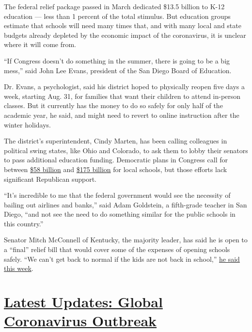 The federal relief package passed in March dedicated \$13.5 billion to
K-12 education --- less than 1 percent of the total stimulus. But
education groups estimate that schools will need many times that, and
with many local and state budgets already depleted by the economic
impact of the coronavirus, it is unclear where it will come from.

``If Congress doesn't do something in the summer, there is going to be a
big mess,'' said John Lee Evans, president of the San Diego Board of
Education.

Dr. Evans, a psychologist, said his district hoped to physically reopen
five days a week, starting Aug. 31, for families that want their
children to attend in-person classes. But it currently has the money to
do so safely for only half of the academic year, he said, and might need
to revert to online instruction after the winter holidays.

The district's superintendent, Cindy Marten, has been calling colleagues
in political swing states, like Ohio and Colorado, to ask them to lobby
their senators to pass additional education funding. Democratic plans in
Congress call for between
\href{https://blogs.edweek.org/edweek/campaign-k-12/2020/05/heroes-act-education-funding-house-passes.html}{\$58
billion} and
\href{https://www.help.senate.gov/imo/media/doc/CCCERA\%20Fact\%20Sheet\%20062920.pdf}{\$175
billion} for local schools, but those efforts lack significant
Republican support.

``It's incredible to me that the federal government would see the
necessity of bailing out airlines and banks,'' said Adam Goldstein, a
fifth-grade teacher in San Diego, ``and not see the need to do something
similar for the public schools in this country.''

Senator Mitch McConnell of Kentucky, the majority leader, has said he is
open to a ``final'' relief bill that would cover some of the expenses of
opening schools safely. ``We can't get back to normal if the kids are
not back in school,''
\href{https://www.courier-journal.com/story/news/politics/2020/07/08/cdc-guidelines-school-reopenings-mitch-mcconnell-trump-differ/5399417002/}{he
said this week}.

\hypertarget{latest-updates-global-coronavirus-outbreak}{%
\section{\texorpdfstring{\href{https://www.nytimes.com/2020/08/04/world/coronavirus-cases.html?action=click\&pgtype=Article\&state=default\&region=MAIN_CONTENT_1\&context=storylines_live_updates}{Latest
Updates: Global Coronavirus
Outbreak}}{Latest Updates: Global Coronavirus Outbreak}}\label{latest-updates-global-coronavirus-outbreak}}

